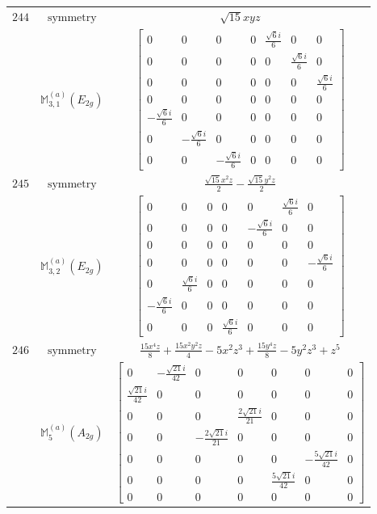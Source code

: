 \documentclass[fleqn,8pt,landscape]{jsarticle}
\begin{document}
\begin{longtable}{ccc}
$ 244 $ & $ \text{symmetry} $ & $ \sqrt{15} x y z $ \\
$  $ & $ \mathbb{M}_{3,1}^{(a)}(E_{2g}) $ & $ \begin{bmatrix} 0 & 0 & 0 & 0 & \frac{\sqrt{6} i}{6} & 0 & 0 \\ 0 & 0 & 0 & 0 & 0 & \frac{\sqrt{6} i}{6} & 0 \\ 0 & 0 & 0 & 0 & 0 & 0 & \frac{\sqrt{6} i}{6} \\ 0 & 0 & 0 & 0 & 0 & 0 & 0 \\ - \frac{\sqrt{6} i}{6} & 0 & 0 & 0 & 0 & 0 & 0 \\ 0 & - \frac{\sqrt{6} i}{6} & 0 & 0 & 0 & 0 & 0 \\ 0 & 0 & - \frac{\sqrt{6} i}{6} & 0 & 0 & 0 & 0 \end{bmatrix} $ \\ \hline
$ 245 $ & $ \text{symmetry} $ & $ \frac{\sqrt{15} x^{2} z}{2} - \frac{\sqrt{15} y^{2} z}{2} $ \\
$  $ & $ \mathbb{M}_{3,2}^{(a)}(E_{2g}) $ & $ \begin{bmatrix} 0 & 0 & 0 & 0 & 0 & \frac{\sqrt{6} i}{6} & 0 \\ 0 & 0 & 0 & 0 & - \frac{\sqrt{6} i}{6} & 0 & 0 \\ 0 & 0 & 0 & 0 & 0 & 0 & 0 \\ 0 & 0 & 0 & 0 & 0 & 0 & - \frac{\sqrt{6} i}{6} \\ 0 & \frac{\sqrt{6} i}{6} & 0 & 0 & 0 & 0 & 0 \\ - \frac{\sqrt{6} i}{6} & 0 & 0 & 0 & 0 & 0 & 0 \\ 0 & 0 & 0 & \frac{\sqrt{6} i}{6} & 0 & 0 & 0 \end{bmatrix} $ \\ \hline
$ 246 $ & $ \text{symmetry} $ & $ \frac{15 x^{4} z}{8} + \frac{15 x^{2} y^{2} z}{4} - 5 x^{2} z^{3} + \frac{15 y^{4} z}{8} - 5 y^{2} z^{3} + z^{5} $ \\
$  $ & $ \mathbb{M}_{5}^{(a)}(A_{2g}) $ & $ \begin{bmatrix} 0 & - \frac{\sqrt{21} i}{42} & 0 & 0 & 0 & 0 & 0 \\ \frac{\sqrt{21} i}{42} & 0 & 0 & 0 & 0 & 0 & 0 \\ 0 & 0 & 0 & \frac{2 \sqrt{21} i}{21} & 0 & 0 & 0 \\ 0 & 0 & - \frac{2 \sqrt{21} i}{21} & 0 & 0 & 0 & 0 \\ 0 & 0 & 0 & 0 & 0 & - \frac{5 \sqrt{21} i}{42} & 0 \\ 0 & 0 & 0 & 0 & \frac{5 \sqrt{21} i}{42} & 0 & 0 \\ 0 & 0 & 0 & 0 & 0 & 0 & 0 \end{bmatrix} $ \\ \hline

\end{longtable}
\end{document}
